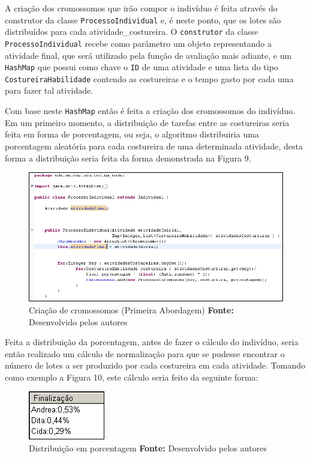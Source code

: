 \par A criação dos cromossomos que irão compor o indivíduo é feita através do construtor da classe 
\texttt{ProcessoIndividual} e, é neste ponto, que os lotes são distribuídos para
cada atividade\_costureira.
O \texttt{construtor} da classe \texttt{ProcessoIndividual} recebe como
parâmetro um objeto representando a atividade final, que será utilizado pela função de avaliação mais adiante, e um \texttt{HashMap} que possui como chave o
\texttt{ID} de uma atividade e uma lista do  tipo \texttt{CostureiraHabilidade} contendo as costureiras e o tempo 
gasto por cada uma para fazer tal atividade.

\par Com base neste \texttt{HashMap} então é feita a criação dos cromossomos do indivíduo.
Em um primeiro momento, a distribuição de tarefas entre as costureiras seria feita em forma 
de porcentagem, ou seja, o algoritmo distribuiria uma porcentagem aleatória para cada costureira de 
uma determinada atividade, desta forma a distribuição seria feita da forma demonstrada na Figura 9.


\begin{figure}[h!]
	\centerline{\includegraphics[scale=0.8]{./imagens/tentativa_1_individual.png}}
	\caption[Classe CostureiraHabilidade]
	{Criação de cromossomos (Primeira Abordagem) \textbf{Fonte:} Desenvolvido pelos autores}
	\label{fig:exemplo1}
\end{figure}
 
\par Feita a distribuição da porcentagem, antes de fazer o cálculo do indivíduo, seria então realizado 
um cálculo de normalização para que se pudesse encontrar o número de lotes a ser
produzido por cada costureira em cada atividade. Tomando como exemplo a Figura 10, este cálculo seria feito da seguinte forma:

\begin{figure}[h!]
	\centerline{\includegraphics[scale=1.0]{./imagens/distribuicao_porcentagem.png}}
	\caption[Classe CostureiraHabilidade]
	{Distribuição em porcentagem \textbf{Fonte:} Desenvolvido pelos autores}
	\label{fig:exemplo1}
\end{figure}

